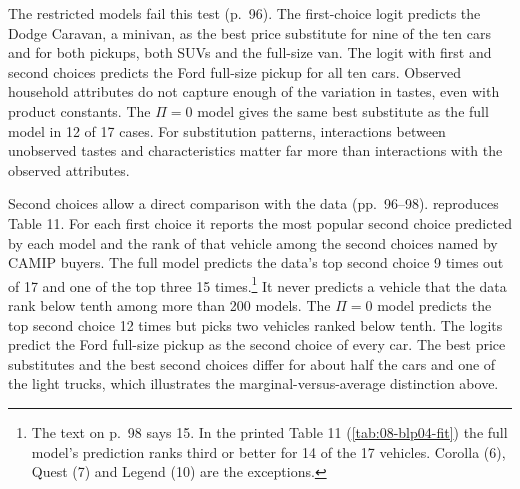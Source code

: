 The restricted models fail this test (p.~96). The first-choice logit predicts the Dodge Caravan, a minivan, as
the best price substitute for nine of the ten cars and for both pickups, both SUVs and the full-size van. The
logit with first and second choices predicts the Ford full-size pickup for all ten cars. Observed household
attributes do not capture enough of the variation in tastes, even with product constants. The $\Pi = 0$ model
gives the same best substitute as the full model in 12 of 17 cases. For substitution patterns, interactions
between unobserved tastes and characteristics matter far more than interactions with the observed attributes.

Second choices allow a direct comparison with the data (pp.~96--98).  reproduces
Table 11. For each first choice it reports the most popular second choice predicted by each model and the rank
of that vehicle among the second choices named by CAMIP buyers. The full model predicts the data's top
second choice 9 times out of 17 and one of the top three 15 times.\footnote{The text on p.~98 says 15. In the
printed Table 11 (\cref{tab:08-blp04-fit}) the full model's prediction ranks third or better for 14 of the 17
vehicles. Corolla (6), Quest (7) and Legend (10) are the exceptions.} It never predicts a vehicle that the data
rank below tenth among more than 200 models. The $\Pi = 0$ model predicts the top second choice 12 times but
picks two vehicles ranked below tenth. The logits predict the Ford full-size pickup as the second choice of
every car. The best price substitutes and the best second choices differ for about half the cars and one of
the light trucks, which illustrates the marginal-versus-average distinction above.

